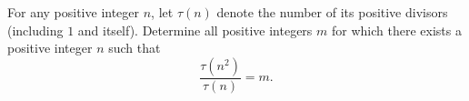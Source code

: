 For any positive integer $n$,
let $\tau(n)$ denote the number of its positive divisors (including $1$ and itself).
Determine all positive integers $m$ for which
there exists a positive integer $n$ such that
\[ \frac{\tau(n^{2})}{\tau(n)}=m. \]